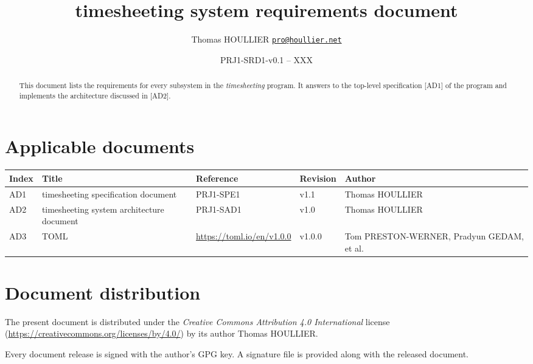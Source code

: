 \documentclass[letterpaper]{article}
\title{timesheeting system requirements document}
\author{Thomas HOULLIER \href{mailto:pro@houllier.net}
         {\texttt{\textlangle pro@houllier.net\textrangle}}}
\begin{document}
\frenchspacing
\date{PRJ1-SRD1-v0.1 -- XXX}
\maketitle
\thispagestyle{FirstPage}

\begin{abstract}
  This document lists the requirements for every subsystem in the
  \emph{timesheeting} program.
  It answers to the top-level specification [AD1] of the program and implements
  the architecture discussed in [AD2].
\end{abstract}

\begin{versionhistory}
\end{versionhistory}
\setcounter{table}{0} %

\section*{Applicable documents}
{ \centering
\begin{tabularx}{\textwidth}{| X | X | X | X | X |} \hline
  Index & Title & Reference & Revision & Author \\ \hline
  AD1   & timesheeting specification document & PRJ1-SPE1 & v1.1 & Thomas
  HOULLIER \\ \hline
  AD2   & timesheeting system architecture document & PRJ1-SAD1 & v1.0 & Thomas
  HOULLIER \\ \hline
  AD3   & TOML & \url{https://toml.io/en/v1.0.0} & v1.0.0 & Tom PRESTON-WERNER,
                                                            Pradyun GEDAM, et
                                                            al. \\
  \hline \end{tabularx} \par }

\section*{Document distribution}
The present document is distributed under the \emph{Creative Commons Attribution
4.0 International} license (\url{https://creativecommons.org/licenses/by/4.0/})
by its author Thomas HOULLIER.

Every document release is signed with the author's GPG key. A signature file
is provided along with the released document.

\tableofcontents
\printglossary[type=\acronymtype,style=index]
\pagestyle{plain}





\appendix


\apptocmd{\thebibliography}{\raggedright}{}{}
\begingroup
{}
\setlength\bibitemsep{0pt}
\printbibliography
\endgroup
\end{document}
